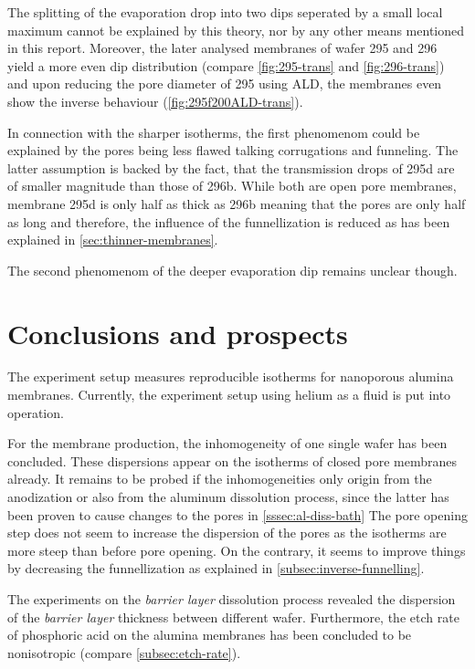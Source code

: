 \documentclass[../thesis.tex]{subfiles}
\begin{document}
              The splitting of the evaporation drop into two dips seperated by a small local maximum cannot be explained by this theory, nor by any other means mentioned in this report. Moreover, the later analysed membranes of wafer 295 and 296 yield a more even dip distribution (compare \cref{fig:295-trans} and \cref{fig:296-trans}) and upon reducing the pore diameter of 295 using ALD, the membranes even show the inverse behaviour (\cref{fig:295f200ALD-trans}).

              In connection with the sharper isotherms, the first phenomenom could be explained by the pores being less flawed talking corrugations and funneling. The latter assumption is backed by the fact, that the transmission drops of 295d are of smaller magnitude than those of 296b. While both are open pore membranes, membrane 295d is only half as thick as 296b meaning that the pores are only half as long and therefore, the influence of the funnellization is reduced as has been explained in \cref{sec:thinner-membranes}.

              The second phenomenom of the deeper evaporation dip remains unclear though.

              


  \section{Conclusions and prospects}

    The experiment setup measures reproducible isotherms for nanoporous alumina membranes. Currently, the experiment setup using helium as a fluid is put into operation.

    For the membrane production, the inhomogeneity of one single wafer has been concluded. These dispersions appear on the isotherms of closed pore membranes already. It remains to be probed if the inhomogeneities only origin from the anodization or also from the aluminum dissolution process, since the latter has been proven to cause changes to the pores in \cref{sssec:al-diss-bath} The pore opening step does not seem to increase the dispersion of the pores as the isotherms are more steep than before pore opening. On the contrary, it seems to improve things by decreasing the funnellization as explained in \cref{subsec:inverse-funnelling}.

    The experiments on the \textit{barrier layer} dissolution process revealed the dispersion of the \textit{barrier layer} thickness between different wafer. Furthermore, the etch rate of phosphoric acid on the alumina membranes has been concluded to be nonisotropic (compare \cref{subsec:etch-rate}).
\end{document}
